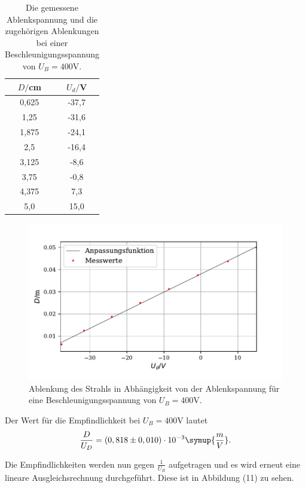 \begin{table}[H]
  \centering
  \caption{Die gemessene Ablenkspannung und die zugehörigen Ablenkungen bei einer Beschleunigungsspannung von $U_B = 400 \si{\volt}$.}
  \label{tab:Parameter}
  \begin{tabular}{c c}
    \toprule
    $D/$cm& $U_d/$V \\
    \bottomrule
     0,625 & -37,7 \\
     1,25 & -31,6 \\
     1,875 & -24,1  \\
     2,5 & -16,4 \\
     3,125 & -8,6  \\
     3,75& -0,8 \\
     4,375 & 7,3  \\
     5,0 &  15,0 \\
     \bottomrule
  \end{tabular}
\end{table}

\begin{figure}[H]
  \centering
  \includegraphics{plot7.pdf}
  \caption{Ablenkung des Strahls in Abhängigkeit von der Ablenkspannung für eine Beschleunigungsspannung von $U_B = 400 \si{\volt}$. }
  \label{fig:plot}
\end{figure}

Der Wert für die Empfindlichkeit bei $U_B = 400 \si{\volt}$ lautet
\begin{align*}
\frac{D}{U_D} = (0,818 \pm 0,010) \cdot 10^{-3} \symup{\frac{m}{V}} .
\end{align*}

\noindent Die Empfindlichkeiten werden nun gegen $\frac{1}{U_B}$ aufgetragen und es wird erneut eine lineare Ausgleichsrechnung durchgeführt. Diese ist in Abbildung (11) zu sehen.

